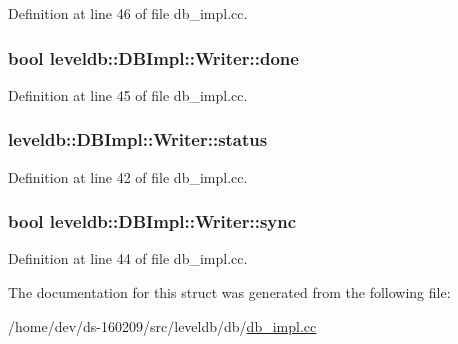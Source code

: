 Definition at line 46 of file db\+\_\+impl.\+cc.

\hypertarget{structleveldb_1_1_d_b_impl_1_1_writer_afc6025afd873f82252cb563687bd3106}{}
\subsubsection[{done}]{\setlength{\rightskip}{0pt plus 5cm}bool leveldb\+::\+D\+B\+Impl\+::\+Writer\+::done}\label{structleveldb_1_1_d_b_impl_1_1_writer_afc6025afd873f82252cb563687bd3106}


Definition at line 45 of file db\+\_\+impl.\+cc.

\hypertarget{structleveldb_1_1_d_b_impl_1_1_writer_af3b0436a99d2679c0e0ac9f6e1fefa37}{}
\subsubsection[{status}]{ leveldb\+::\+D\+B\+Impl\+::\+Writer\+::status}\label{structleveldb_1_1_d_b_impl_1_1_writer_af3b0436a99d2679c0e0ac9f6e1fefa37}


Definition at line 42 of file db\+\_\+impl.\+cc.

\hypertarget{structleveldb_1_1_d_b_impl_1_1_writer_acb39717e1fa61127f262b474e18ec9f6}{}
\subsubsection[{sync}]{\setlength{\rightskip}{0pt plus 5cm}bool leveldb\+::\+D\+B\+Impl\+::\+Writer\+::sync}\label{structleveldb_1_1_d_b_impl_1_1_writer_acb39717e1fa61127f262b474e18ec9f6}


Definition at line 44 of file db\+\_\+impl.\+cc.



The documentation for this struct was generated from the following file\+:\begin{DoxyCompactItemize}
\item 
/home/dev/ds-\/160209/src/leveldb/db/\hyperlink{db__impl_8cc}{db\+\_\+impl.\+cc}\end{DoxyCompactItemize}
